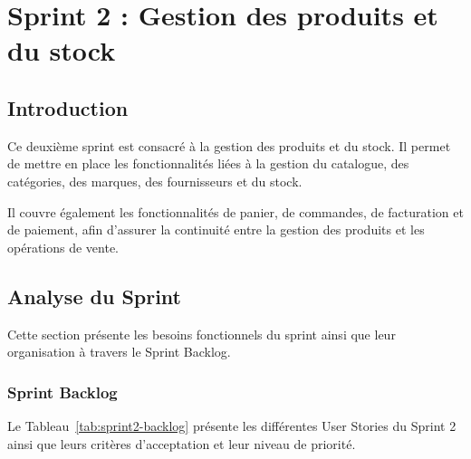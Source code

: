 \chapter{Sprint 2 : Gestion des produits et du stock}
\localtableofcontents
\newpage
\section{Introduction}

Ce deuxième sprint est consacré à la gestion des produits et du stock. Il permet de mettre en place les fonctionnalités liées à la gestion du catalogue, des catégories, des marques, des fournisseurs et du stock.

Il couvre également les fonctionnalités de panier, de commandes, de facturation et de paiement, afin d'assurer la continuité entre la gestion des produits et les opérations de vente.

\section{Analyse du Sprint}

Cette section présente les besoins fonctionnels du sprint ainsi que leur organisation à travers le Sprint Backlog.

\subsection*{Sprint Backlog}
Le Tableau~\ref{tab:sprint2-backlog} présente les différentes User Stories du Sprint 2 ainsi que leurs critères d'acceptation et leur niveau de priorité.


